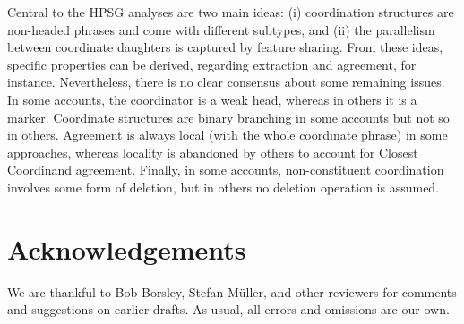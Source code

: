 Central to the HPSG analyses are two main ideas: (i) coordination structures are non-headed phrases and come with different subtypes, and (ii) the parallelism between coordinate daughters is captured by feature sharing. From these ideas, specific properties can be derived, regarding extraction and agreement, for instance. Nevertheless, there is no clear consensus about some remaining issues. In some accounts, the coordinator is a weak head, whereas in others it is a marker. Coordinate structures are binary branching in some accounts but not so in others. Agreement is always local (with the whole coordinate phrase) in some approaches, whereas locality is abandoned by others to account for Closest Coordinand agreement. Finally, in some accounts, non-constituent coordination involves some form of deletion, but in others no deletion operation is assumed.

 
%


\section*{Acknowledgements}

We are thankful to Bob Borsley, Stefan M\"{u}ller, and other reviewers for comments and suggestions on earlier drafts. 
As usual, all errors and omissions are our own.


{\sloppy
\printbibliography[heading=subbibliography,notkeyword=this] 
}



